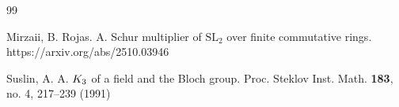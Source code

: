 \documentclass[11pt]{amsart}
\theoremstyle{definition}
\theoremstyle{plain}
\theoremstyle{definition}
\numberwithin{equation}{section}
\newcommand{\z}{\mathbb{Z}}
\newcommand{\SL}{\mathit{{\rm SL}}}
\begin{document}
\begin{thebibliography}{99}
		
		
		
		
		
		Mirzaii, B. Rojas. A. Schur multiplier of $\mathrm{SL}_2$ over finite commutative rings. https://arxiv.org/abs/2510.03946
		
		Suslin, A. A. $K\sb 3$ of a field and the Bloch group. Proc. Steklov Inst. Math. {\bf 183}, no. 4, 217--239 (1991)
		
		
		
		
		
		
		
	\end{thebibliography}
	
\end{document}
